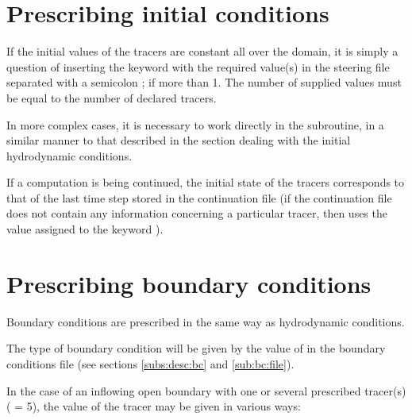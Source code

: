 \section{Prescribing initial conditions}

If the initial values of the tracers are constant all over the domain,
it is simply a question of inserting the keyword
 with the required value(s) in the steering
file separated with a semicolon ; if more than 1.
The number of supplied values must be equal to the number of declared tracers.

In more complex cases, it is necessary to work directly in the
 subroutine, in a similar manner to that described
in the section dealing with the initial hydrodynamic conditions.

If a computation is being continued, the initial state of the tracers
corresponds to that of the last time step stored in the continuation file
(if the continuation file does not contain any information concerning
a particular tracer,  then uses the value assigned to the keyword
).

\section{Prescribing boundary conditions}
\label{sec:tr:prescr:bc}
Boundary conditions are prescribed in the same way as hydrodynamic conditions.

The type of boundary condition will be given by the value of 
in the boundary conditions file (see sections \ref{subs:desc:bc} and
\ref{sub:bc:file}).

In the case of an inflowing open boundary with one or several prescribed tracer(s)
( = 5), the value of the tracer may be given in various ways:

